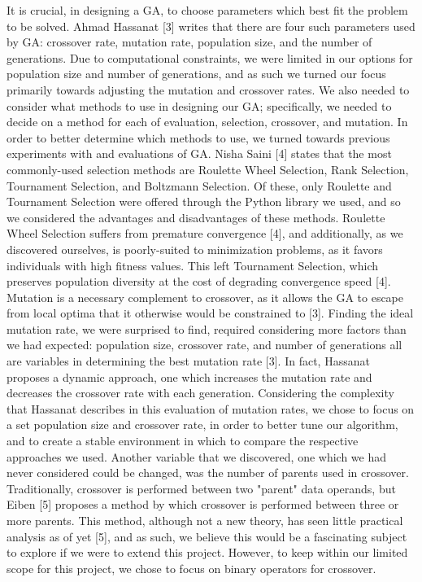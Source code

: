 \documentclass[10pt, conference]{IEEEtran}
\begin{document}
It is crucial, in designing a GA, to choose parameters which best fit the problem to be solved. Ahmad Hassanat [3] writes that there are four such parameters used by GA: crossover rate, mutation rate, population size, and the number of generations. Due to computational constraints, we were limited in our options for population size and number of generations, and as such we turned our focus primarily towards adjusting the mutation and crossover rates.\newline
We also needed to consider what methods to use in designing our GA; specifically, we needed to decide on a method for each of evaluation, selection, crossover, and mutation. In order to better determine which methods to use, we turned towards previous experiments with and evaluations of GA. Nisha Saini [4] states that the most commonly-used selection methods are Roulette Wheel Selection, Rank Selection, Tournament Selection, and Boltzmann Selection. Of these, only Roulette and Tournament Selection were offered through the Python library we used, and so we considered the advantages and disadvantages of these methods. Roulette Wheel Selection suffers from premature convergence [4], and additionally, as we discovered ourselves, is poorly-suited to minimization problems, as it favors individuals with high fitness values. This left Tournament Selection, which preserves population diversity at the cost of degrading convergence speed [4].\newline
Mutation is a necessary complement to crossover, as it allows the GA to escape from local optima that it otherwise would be constrained to [3]. Finding the ideal mutation rate, we were surprised to find, required considering more factors than we had expected: population size, crossover rate, and number of generations all are variables in determining the best mutation rate [3]. In fact, Hassanat proposes a dynamic approach, one which increases the mutation rate and decreases the crossover rate with each generation. Considering the complexity that Hassanat describes in this evaluation of mutation rates, we chose to focus on a set population size and crossover rate, in order to better tune our algorithm, and to create a stable environment in which to compare the respective approaches we used.\newline
Another variable that we discovered, one which we had never considered could be changed, was the number of parents used in crossover. Traditionally, crossover is performed between two "parent" data operands, but Eiben [5] proposes a method by which crossover is performed between three or more parents. This method, although not a new theory, has seen little practical analysis as of yet [5], and as such, we believe this would be a fascinating subject to explore if we were to extend this project. However, to keep within our limited scope for this project, we chose to focus on binary operators for crossover.
\end{document}
